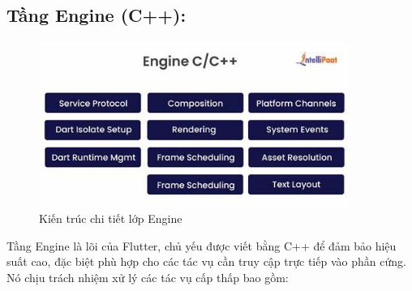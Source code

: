 \documentclass[../DoAn.tex]{subfiles}
\numberwithin{figure}{chapter}
\begin{document}
\subsection{Tầng Engine (C++):} 
\begin{figure}[H]
    \centering
    \includegraphics[width=0.9\textwidth]{Hinhve/Chuong5/enginelayer.jpg}
    \caption{Kiến trúc chi tiết lớp Engine}
    \label{fig:enginelayer}
\end{figure}
Tầng Engine là lõi của Flutter, chủ yếu được viết bằng C++ để đảm bảo hiệu suất cao, đặc biệt phù hợp cho các tác vụ cần truy cập trực tiếp vào phần cứng. Nó chịu trách nhiệm xử lý các tác vụ cấp thấp bao gồm:
\end{document}

